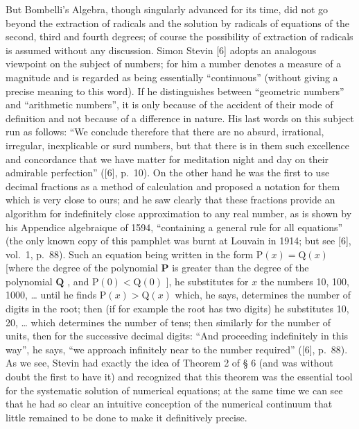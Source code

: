 But Bombelli's Algebra, though singularly advanced for its time, did not go beyond the extraction of radicals and the solution by radicals of equations of the second, third and fourth degrees; of course the possibility of extraction of radicals is assumed without any discussion. Simon Stevin {[}6{]} adopts an analogous viewpoint on the subject of numbers; for him a number denotes a measure of a magnitude and is regarded as being essentially ``continuous'' (without giving a precise meaning to this word). If he distinguishes between ``geometric numbers'' and ``arithmetic numbers'', it is only because of the accident of their mode of definition and not because of a difference in nature. His last words on this subject run as follows: ``We conclude therefore that there are no absurd, irrational, irregular, inexplicable or surd numbers, but that there is in them such excellence and concordance that we have matter for meditation night and day on their admirable perfection'' ({[}6{]}, p.~10). On the other hand he was the first to use decimal fractions as a method of calculation and proposed a notation for them which is very close to ours; and he saw clearly that these fractions provide an algorithm for indefinitely close approximation to any real number, as is shown by his Appendice algebraique of 1594, ``containing a general rule for all equations'' (the only known copy of this pamphlet was burnt at Louvain in 1914; but see {[}6{]}, vol.~1, p.~88). Such an equation being written in the form \(\mathrm{P}(x) = \mathrm{Q}(x)\) {[}where the degree of the polynomial \(\mathbf{P}\) is greater than the degree of the polynomial \(\mathbf{Q}\) , and \(\mathrm{P(0)} < \mathrm{Q(0)}\) {]}, he substitutes for \(x\) the numbers 10, 100, 1000, \ldots{} until he finds \(\mathrm{P}(x) > \mathrm{Q}(x)\) which, he says, determines the number of digits in the root; then (if for example the root has two digits) he substitutes 10, 20, \ldots{} which determines the number of tens; then similarly for the number of units, then for the successive decimal digits: ``And proceeding indefinitely in this way'', he says, ``we approach infinitely near to the number required'' ({[}6{]}, p.~88). As we see, Stevin had exactly the idea of Theorem 2 of § 6 (and was without doubt the first to have it) and recognized that this theorem was the essential tool for the systematic solution of numerical equations; at the same time we can see that he had so clear an intuitive conception of the numerical continuum that little remained to be done to make it definitively precise.

